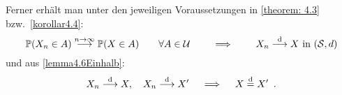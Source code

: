 Ferner erhält man unter den jeweiligen Voraussetzungen in \cref{theorem: 4.3} bzw.\ \cref{korollar4.4}:
\begin{equation*}
	\P(X_n\in A) \ntoinf \P(X\in A)\qquad\forall A\in \mathcal{U}
	\qquad \implies \qquad
	X_n \distto  X\text{ in }(\S,d)
\end{equation*}
und aus \cref{lemma4.6Einhalb}:
\begin{equation*}
	X_n\distto  X, \quad X_n\distto  X' 
	\quad \implies \quad
	X \disteq X' \satzende
\end{equation*}
